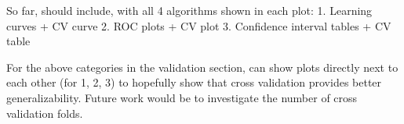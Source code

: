 \documentclass{anstrans}
\renewcommand{\vec}[1]{\bm{#1}} %
\newcommand{\vd}{\bm{\cdot}} %
\newcommand{\grad}{\vec{\nabla}} %
\begin{document}
So far, should include, with all 4 algorithms shown in each plot:
1. Learning curves  + CV curve
2. ROC plots + CV plot
3. Confidence interval tables + CV table

For the above categories in the validation section, can show plots directly
next to each other (for 1, 2, 3) to hopefully show that cross validation
provides better generalizability.  Future work would be to investigate the
number of cross validation folds. 

%
%
%
%
\end{document}

